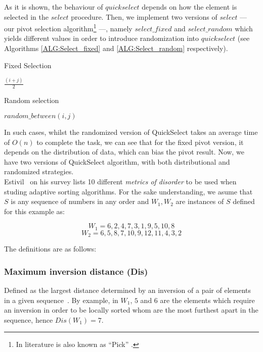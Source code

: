 As it is shown, the behaviour of $quickselect$ depends on how the element is selected in the $select$ procedure. Then, we implement two versions of $select$ --- our pivot selection algorithm\footnote{In literature is also known as ``Pick'' .} ---, namely $select\_fixed$ and $select\_random$ which yields different values in order to introduce randomization into $quickselect$ (see Algorithms \ref{ALG:Select_fixed} and \ref{ALG:Select_random} respectively).\\

\begin{algorithm}
  \caption{Fixed Selection}\label{ALG:Select_fixed}
  \begin{algorithmic}[1]
    \State \Return $\frac{(i+j)}{2}$
    \EndProcedure
  \end{algorithmic}
\end{algorithm}

\begin{algorithm}
  \caption{Random selection}\label{ALG:Select_random}
  \begin{algorithmic}[1]
    \State \Return $random\_between(i,j)$
    \EndProcedure
  \end{algorithmic}
\end{algorithm}

In such cases, whilst the randomized version of QuickSelect takes an average time of $O(n)$ to complete the task, we can see that for the fixed pivot version, it depends on the distribution of data, which can bias the pivot result. Now, we have two versions of QuickSelect algorithm, with both distributional and randomized strategies.\\

Estivil~\cite{estivil92} on his survey lists 10 different \textit{metrics of disorder} to be used when studing adaptive sorting algorithms. For the sake understanding, we asume that $S$ is any sequence of numbers in any order and $W_1,W_2$ are instances of $S$ defined for this example as: 

$$W_1 = {6,2,4,7,3,1,9,5,10,8}$$
$$W_2 = {6,5,8,7,10,9,12,11,4,3,2}$$

The definitions are as follows:

\subsubsection{Maximum inversion distance (Dis)}
Defined as the largest distance determined by an inversion of a pair of elements in a given sequence~\cite{Estivill-Castro_Wood_1989}.  By example, in $W_1$,  $5$ and $6$ are the elements which require an inversion in order to be locally sorted whom are the most furthest apart in the sequence, hence $Dis(W_1) = 7$.\\

